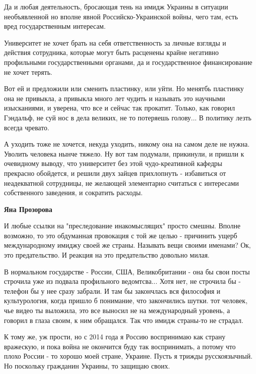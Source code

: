 \begin{itemize}
\begin{itemize}
Да и любая деятельность, бросающая тень на имидж Украины в ситуации
необъявленной но вполне явной Российско-Украинской войны, чего там, есть вред
государственным интересам.

Университет не хочет брать на себя ответственность за личные взгляды и действия
сотрудника, которые могут быть расценены крайне негативно профильными
государственными органами, да и государственное финансирование не хочет терять.

Вот ей и предложили или сменить пластинку, или уйти. Но менятбь пластинку она
не привыкла, а привыкла много лет чудить и называть это научными изысканиями, и
уверена, что все и сейчас так прокатит. Только, как говорил Гэндальф, не суй
нос в дела великих, не то потеряешь голову... В политику лезть всегда чревато.

А уходить тоже не хочется, некуда уходить, никому она на самом деле не нужна.
Уволить человека нынче тяжело. Ну вот там подумали, прикинули, и пришли к
очевидному выводу, что университет без этой чудо-креативной кафедры прекрасно
обойдется, и решили двух зайцев прихлопнуть - избавиться от неадекватной
сотрудницы, не желающей элементарно считаться с интересами собственного
заведения, и сократить расходы.

 
\textbf{Яна Прозорова} 

И любые ссылки на "преследование инакомыслящих" просто смешны. Вполне возможно,
то это обдуманная провокация с той же целью - причинить ущерб международному
имиджу своей же страны. Называть вещи своими именами? Ок, это предательство. И
реакция на это предательство довольно милая. 

В нормальном государстве - России, США, Великобритании - она бы свои посты
строчила уже из подвала профильного ведомтсва... Хотя нет, не строчила бы -
телефон бы у нее сразу забрали. И там бы закончлась вся философия и
культурология, когда пришло б понимание, что закончились шутки. тот человек,
чье видео ты выложила, это все выносил не на международный уровень, а говорил в
глаза своим, к ним обращался. Так что имидж страны-то не страдал. 

К тому же, уж прости, но с 2014 года я Россию воспринимаю как страну вражескую,
и пока война не окончится буду так воспринимать, а потому что плохо России - то
хорошо моей стране, Украине. Пусть я трижды русскоязычный. Но поскольку
гражданин Украины, то защищаю своих.


\end{itemize}
\end{itemize}
